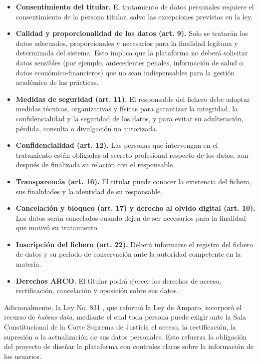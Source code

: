 \begin{itemize}
	\item \textbf{Consentimiento del titular.} El tratamiento de datos personales requiere el consentimiento de la persona titular, salvo las excepciones previstas en la ley.
	\item \textbf{Calidad y proporcionalidad de los datos (art. 9).} Solo se tratarán los datos adecuados, proporcionales y necesarios para la finalidad legítima y determinada del sistema. Esto implica que la plataforma no deberá solicitar datos sensibles (por ejemplo, antecedentes penales, información de salud o datos económico-financieros) que no sean indispensables para la gestión académica de las prácticas.
	\item \textbf{Medidas de seguridad (art. 11).} El responsable del fichero debe adoptar medidas técnicas, organizativas y físicas para garantizar la integridad, la confidencialidad y la seguridad de los datos, y para evitar su adulteración, pérdida, consulta o divulgación no autorizada.
	\item \textbf{Confidencialidad (art. 12).} Las personas que intervengan en el tratamiento están obligadas al secreto profesional respecto de los datos, aun después de finalizada su relación con el responsable.
	\item \textbf{Transparencia (art. 16).} El titular puede conocer la existencia del fichero, sus finalidades y la identidad de su responsable.
	\item \textbf{Cancelación y bloqueo (art. 17) y derecho al olvido digital (art. 10).} Los datos serán cancelados cuando dejen de ser necesarios para la finalidad que motivó su tratamiento.
	\item \textbf{Inscripción del fichero (art. 22).} Deberá informarse el registro del fichero de datos y su periodo de conservación ante la autoridad competente en la materia.
	\item \textbf{Derechos ARCO.} El titular podrá ejercer los derechos de acceso, rectificación, cancelación y oposición sobre sus datos.
\end{itemize}

Adicionalmente, la Ley No. 831 \parencite{ley831_2013}, que reformó la Ley de Amparo, incorporó el recurso de \textit{habeas data}, mediante el cual toda persona puede exigir ante la Sala Constitucional de la Corte Suprema de Justicia el acceso, la rectificación, la supresión o la actualización de sus datos personales. Esto refuerza la obligación del proyecto de diseñar la plataforma con controles claros sobre la información de los usuarios.

